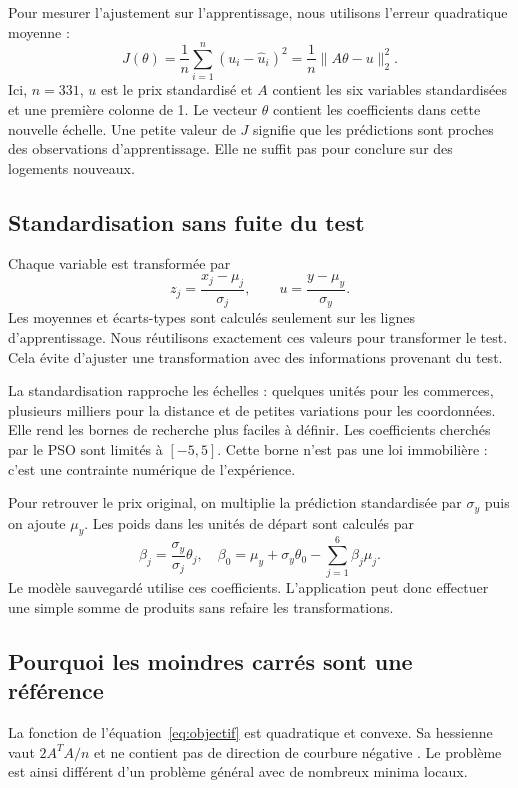 \documentclass[conference,a4paper]{IEEEtran}
\begin{document}
Pour mesurer l'ajustement sur l'apprentissage, nous utilisons l'erreur quadratique moyenne :
\begin{equation}
J(\theta)=\frac{1}{n}\sum_{i=1}^{n}(u_i-\widehat u_i)^2
=\frac{1}{n}\|A\theta-u\|_2^2.
\label{eq:objectif}
\end{equation}
Ici, $n=331$, $u$ est le prix standardisé et $A$ contient les six variables standardisées et une première colonne de 1. Le vecteur $\theta$ contient les coefficients dans cette nouvelle échelle. Une petite valeur de $J$ signifie que les prédictions sont proches des observations d'apprentissage. Elle ne suffit pas pour conclure sur des logements nouveaux.

\subsection{Standardisation sans fuite du test}
Chaque variable est transformée par
\begin{equation}
z_j=\frac{x_j-\mu_j}{\sigma_j},\qquad
u=\frac{y-\mu_y}{\sigma_y}.
\end{equation}
Les moyennes et écarts-types sont calculés seulement sur les lignes d'apprentissage. Nous réutilisons exactement ces valeurs pour transformer le test. Cela évite d'ajuster une transformation avec des informations provenant du test.

La standardisation rapproche les échelles : quelques unités pour les commerces, plusieurs milliers pour la distance et de petites variations pour les coordonnées. Elle rend les bornes de recherche plus faciles à définir. Les coefficients cherchés par le PSO sont limités à $[-5,5]$. Cette borne n'est pas une loi immobilière : c'est une contrainte numérique de l'expérience.

Pour retrouver le prix original, on multiplie la prédiction standardisée par $\sigma_y$ puis on ajoute $\mu_y$. Les poids dans les unités de départ sont calculés par
\begin{equation}
\beta_j=\frac{\sigma_y}{\sigma_j}\theta_j,\quad
\beta_0=\mu_y+\sigma_y\theta_0-\sum_{j=1}^{6}\beta_j\mu_j.
\end{equation}
Le modèle sauvegardé utilise ces coefficients. L'application peut donc effectuer une simple somme de produits sans refaire les transformations.

\subsection{Pourquoi les moindres carrés sont une référence}
La fonction de l'équation~\eqref{eq:objectif} est quadratique et convexe. Sa hessienne vaut $2A^TA/n$ et ne contient pas de direction de courbure négative \cite{boyd}. Le problème est ainsi différent d'un problème général avec de nombreux minima locaux.
\end{document}
